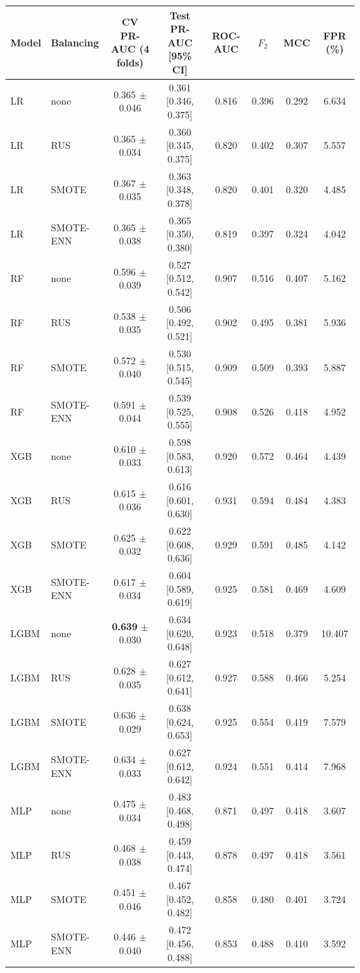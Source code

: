 \begin{tabular}{llcccccc}
\hline
Model & Balancing & CV PR-AUC (4 folds) & Test PR-AUC [95\% CI] & ROC-AUC & $F_2$ & MCC & FPR (\%) \\
\hline
LR & none & {0.365} $\pm$ 0.046 & 0.361 [0.346, 0.375] & 0.816 & 0.396 & 0.292 & 6.634 \\
LR & RUS & {0.365} $\pm$ 0.034 & 0.360 [0.345, 0.375] & 0.820 & 0.402 & 0.307 & 5.557 \\
LR & SMOTE & {0.367} $\pm$ 0.035 & 0.363 [0.348, 0.378] & 0.820 & 0.401 & 0.320 & 4.485 \\
LR & SMOTE-ENN & {0.365} $\pm$ 0.038 & 0.365 [0.350, 0.380] & 0.819 & 0.397 & 0.324 & 4.042 \\
RF & none & {0.596} $\pm$ 0.039 & 0.527 [0.512, 0.542] & 0.907 & 0.516 & 0.407 & 5.162 \\
RF & RUS & {0.538} $\pm$ 0.035 & 0.506 [0.492, 0.521] & 0.902 & 0.495 & 0.381 & 5.936 \\
RF & SMOTE & {0.572} $\pm$ 0.040 & 0.530 [0.515, 0.545] & 0.909 & 0.509 & 0.393 & 5.887 \\
RF & SMOTE-ENN & {0.591} $\pm$ 0.044 & 0.539 [0.525, 0.555] & 0.908 & 0.526 & 0.418 & 4.952 \\
XGB & none & {0.610} $\pm$ 0.033 & 0.598 [0.583, 0.613] & 0.920 & 0.572 & 0.464 & 4.439 \\
XGB & RUS & {0.615} $\pm$ 0.036 & 0.616 [0.601, 0.630] & 0.931 & 0.594 & 0.484 & 4.383 \\
XGB & SMOTE & {0.625} $\pm$ 0.032 & 0.622 [0.608, 0.636] & 0.929 & 0.591 & 0.485 & 4.142 \\
XGB & SMOTE-ENN & {0.617} $\pm$ 0.034 & 0.604 [0.589, 0.619] & 0.925 & 0.581 & 0.469 & 4.609 \\
LGBM & none & \textbf{0.639} $\pm$ 0.030 & 0.634 [0.620, 0.648] & 0.923 & 0.518 & 0.379 & 10.407 \\
LGBM & RUS & {0.628} $\pm$ 0.035 & 0.627 [0.612, 0.641] & 0.927 & 0.588 & 0.466 & 5.254 \\
LGBM & SMOTE & {0.636} $\pm$ 0.029 & 0.638 [0.624, 0.653] & 0.925 & 0.554 & 0.419 & 7.579 \\
LGBM & SMOTE-ENN & {0.634} $\pm$ 0.033 & 0.627 [0.612, 0.642] & 0.924 & 0.551 & 0.414 & 7.968 \\
MLP & none & {0.475} $\pm$ 0.034 & 0.483 [0.468, 0.498] & 0.871 & 0.497 & 0.418 & 3.607 \\
MLP & RUS & {0.468} $\pm$ 0.038 & 0.459 [0.443, 0.474] & 0.878 & 0.497 & 0.418 & 3.561 \\
MLP & SMOTE & {0.451} $\pm$ 0.046 & 0.467 [0.452, 0.482] & 0.858 & 0.480 & 0.401 & 3.724 \\
MLP & SMOTE-ENN & {0.446} $\pm$ 0.040 & 0.472 [0.456, 0.488] & 0.853 & 0.488 & 0.410 & 3.592 \\
\hline
\end{tabular}
